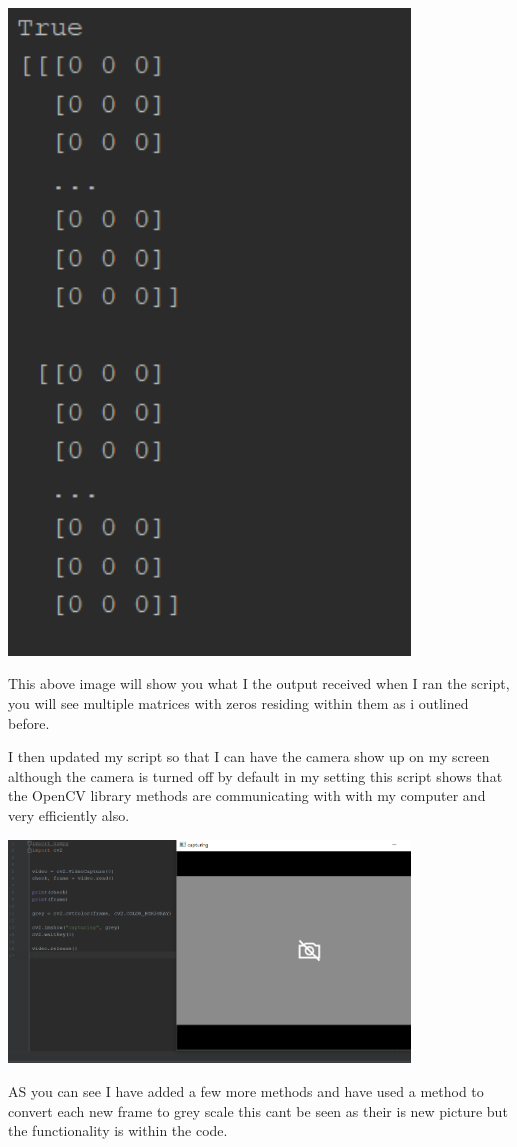 \includegraphics[width=0.8\textwidth]{Figures/terminalPythonScript.png}

This above image will show you what I the output received when I ran the script, you will see multiple matrices with zeros residing within them as i outlined before. 

I then updated my script so that I can have the camera show up on my screen although the camera is turned off by default in my setting this script shows that the OpenCV library methods are communicating with with my computer and very efficiently also.

\includegraphics[width=0.8\textwidth]{Figures/Pythonscriptwithcamera.png}

AS you can see I have added a few more methods and have used a method to convert each new frame to grey scale this cant be seen as their is new picture but the functionality is within the code.




